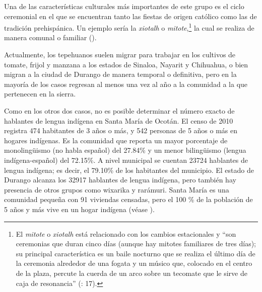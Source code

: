 \documentclass[output=paper]{../langscibook}
\begin{document}
\largerpage[-1]
Una de las características culturales más importantes de este grupo es el ciclo ceremonial en el que se encuentran tanto las fiestas de origen católico como las de tradición prehispánica. Un ejemplo sería la \textit{xiotalh} o \textit{mitote},\footnote{El \textit{mitote} o \textit{xiotalh} está relacionado con los cambios estacionales y “son ceremonias que duran cinco días (aunque hay mitotes familiares de tres días); su principal característica es un baile nocturno que se realiza el último día de la ceremonia alrededor de una fogata y un músico que, colocado en el centro de la plaza, percute la cuerda de un arco sobre un tecomate que le sirve de caja de resonancia” (\citealt{ReyesValdez2006b}: 17).} la cual se realiza de manera comunal o familiar (\citealt{ReyesValdez2006a,ReyesValdez2006b}).

Actualmente, los tepehuanos suelen migrar para trabajar en los cultivos de tomate, frijol y manzana a los estados de Sinaloa, Nayarit y Chihuahua, o bien migran a la ciudad de Durango de manera temporal o definitiva, pero en la mayoría de los casos regresan al menos una vez al año a la comunidad a la que pertenecen en la sierra.

Como en los otros dos casos, no es posible determinar el número exacto de hablantes de lengua indígena en Santa María de Ocotán. El censo de 2010 registra 474 habitantes de 3 años o más, y 542 personas de 5 años o más en hogares indígenas. Es la comunidad que reporta un mayor porcentaje de monolingüismo (no habla español) del 27.84\% y un menor bilingüismo (lengua indígena-español) del 72.15\%. A nivel municipal se cuentan 23724 hablantes de lengua indígena; es decir, el 79.10\% de los habitantes del municipio. El estado de Durango alcanza los 32917 hablantes de lengua indígena, pero también hay presencia de otros grupos como wixarika y rarámuri. Santa María es una comunidad pequeña con 91 viviendas censadas, pero el 100 \% de la población de 5 años y más vive en un hogar indígena (véase ).
\end{document}
